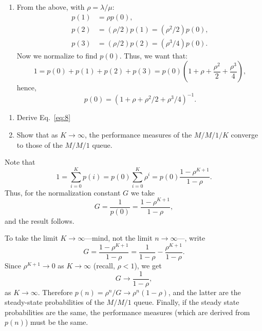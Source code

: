 \begin{question}
\begin{solution}
\begin{enumerate}
  \item From the above, with $\rho=\lambda/\mu$: 
    \begin{align*}
      p(1) &= \rho p(0), \\
      p(2) &= (\rho/2) p(1) = (\rho^2/2) p(0), \\
      p(3) &= (\rho/2) p(2) = (\rho^3/4) p(0).
    \end{align*}
Now we normalize to find $p(0)$. Thus, we want that:
\begin{equation*}
  1 = p(0)+p(1)+p(2)+p(3) = p(0)\left(1 + \rho + \frac{\rho^2}2 + \frac{\rho^3}4\right),
\end{equation*}
hence,
\begin{equation*}
p(0) = (1+\rho + \rho^2/2 + \rho^3/4)^{-1}.
\end{equation*}
\end{enumerate}
   \end{solution}
\end{question}


\begin{question}
  \begin{enumerate}
  \item Derive Eq.~\eqref{eq:8}
  \item   Show that as $K\to\infty$, the performance measures of the $M/M/1/K$ converge to those of the $M/M/1$ queue. 
  \end{enumerate}
  \begin{solution}
Note that 
\begin{equation*}
1 = \sum_{i=0}^K p(i) = p(0)\sum_{i=0}^K \rho^i  = p(0) \frac{1-\rho^{K+1}}{1-\rho}. 
\end{equation*}
Thus, for the normalization constant $G$ we take 
\begin{equation*}
G=\frac 1{p(0)} = \frac{1-\rho^{K+1}}{1-\rho},
\end{equation*}
and the result follows. 

To take the limit $K\to\infty$---mind, not the limit $n\to\infty$---, write
\begin{equation*}
G= \frac{1-\rho^{K+1}}{1-\rho} = \frac{1}{1-\rho} -\frac{\rho^{K+1}}{1-\rho}.
\end{equation*}
Since $\rho^{K+1}\to 0$ as $K\to \infty$ (recall, $\rho<1$),  we get
\begin{equation*}
G \to \frac{1}{1-\rho}, 
\end{equation*}
as $K\to\infty$.  Therefore $p(n)=\rho^n/G \to \rho^n(1-\rho)$, and
the latter are the steady-state probabilities of the $M/M/1$
queue. Finally, if the steady state probabilities are the same, the
performance measures (which are derived from $p(n)$) must be the same.
  \end{solution}
\end{question}

